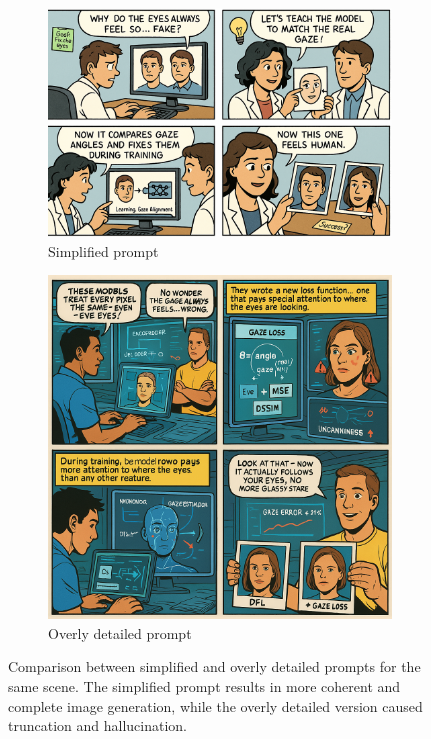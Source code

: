 \begin{figure}[ht]
    \centering

    \begin{subfigure}[t]{0.48\linewidth}
        \centering
        \includegraphics[height=0.7\linewidth]{resources/less_detailed.png}
        \caption{Simplified prompt}
        \label{fig:prompt-simple}
    \end{subfigure}
    \hspace{0.02\linewidth}
    \begin{subfigure}[t]{0.48\linewidth}
        \centering
        \includegraphics[height=0.7\linewidth]{resources/too_much_details.png}
        \caption{Overly detailed prompt}
        \label{fig:prompt-detailed}
    \end{subfigure}

    \caption{Comparison between simplified and overly detailed prompts for the same scene. The simplified prompt results in more coherent and complete image generation, while the overly detailed version caused truncation and hallucination.}
    \label{fig:prompt-detail-comparison}
\end{figure}


